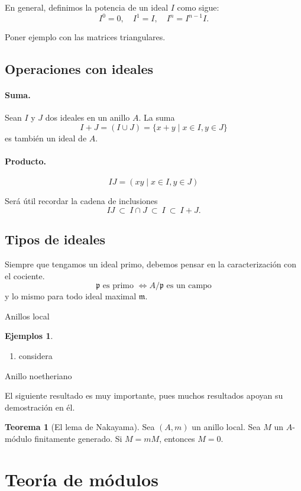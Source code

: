\documentclass[b5paper,10pt]{book}
\theoremstyle{definition}
\newtheorem{thm}{Teorema}
\newtheorem{ej}{Ejemplos}
\begin{document}
En general, definimos la potencia de un ideal \(I\) como sigue:
\[
I^0 = 0,\quad I^1 = I, \quad I^n = I^{n-1}I.
\]

Poner ejemplo con las matrices triangulares.

\subsection{Operaciones con ideales}

\paragraph{Suma.}%
Sean \(I\) y \(J\) dos ideales en un anillo \(A\).
La suma 
\[
I+J = \left(I\cup J\right)= \{x+y \mid x\in I, y\in J\}
\]
es también un ideal de \(A\).

\paragraph{Producto.}%
\[
IJ = \left(xy\mid x\in I, y\in J\right)
\]


Será útil recordar la cadena de inclusiones
\[
IJ\ \subset\ I\cap J\ \subset\ I\ \subset\ I+J.
\]

\subsection{Tipos de ideales}

Siempre que tengamos un ideal primo,
debemos pensar en la caracterización con el cociente.
\[
	\mathfrak{p}\text{ es primo } \iff A/\mathfrak{p} \text{ es un campo}
\]
y lo mismo para todo ideal maximal \(\mathfrak{m}\).


Anillos local


\begin{ej}
\begin{enumerate}[label=(i)]
	\item considera
\end{enumerate}
\end{ej}
Anillo noetheriano

El siguiente resultado es muy importante,
pues muchos resultados apoyan su demostración en él.

\begin{thm}[El lema de Nakayama]
Sea \((A,m)\) un anillo local.
Sea \(M\) un \(A\)-módulo finitamente generado.
Si \(M=mM\), entonces \(M=0\).
\end{thm}

\section{Teoría de módulos}
\end{document}
